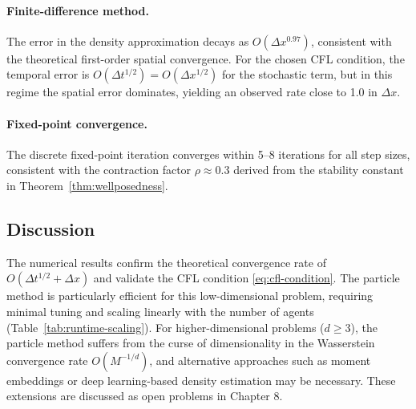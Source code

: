 \paragraph{Finite-difference method.} The error in the density approximation decays
as $O(\Delta x^{0.97})$, consistent with the theoretical first-order spatial
convergence. For the chosen CFL condition, the temporal error is
$O(\Delta t^{1/2}) = O(\Delta x^{1/2})$ for the stochastic term, but in this regime
the spatial error dominates, yielding an observed rate close to 1.0 in $\Delta x$.

\paragraph{Fixed-point convergence.} The discrete fixed-point iteration converges
within 5--8 iterations for all step sizes, consistent with the contraction factor
$\rho \approx 0.3$ derived from the stability constant in Theorem~\ref{thm:wellposedness}.

\subsection{Discussion}

The numerical results confirm the theoretical convergence rate of
$O(\Delta t^{1/2} + \Delta x)$ and validate the CFL condition \eqref{eq:cfl-condition}.
The particle method is particularly efficient for this low-dimensional problem,
requiring minimal tuning and scaling linearly with the number of agents
(Table~\ref{tab:runtime-scaling}). For higher-dimensional problems ($d \ge 3$),
the particle method suffers from the curse of dimensionality in the Wasserstein
convergence rate $O(M^{-1/d})$, and alternative approaches such as moment
embeddings or deep learning-based density estimation may be
necessary. These extensions are discussed as open problems in Chapter 8.

\begin{table}[ht]
\centering
\caption{Computational Cost Comparison (LQ-MFG, $T=1$)}
\label{tab:computational-cost}
\end{table}


